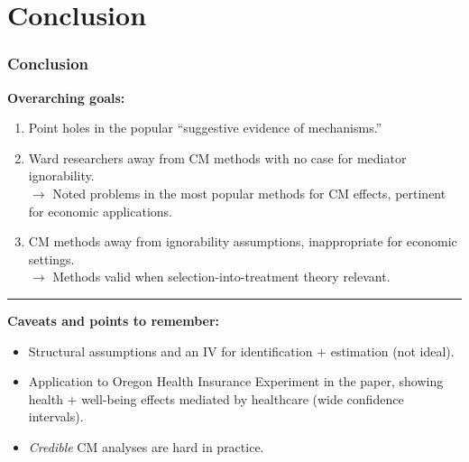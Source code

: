 \documentclass[dvipsnames]{beamer} %
\begin{document}
\section{Conclusion}
\begin{frame}
    \frametitle{Conclusion}
    \textbf{Overarching goals:}
    \begin{enumerate}
        \item Point holes in the popular ``suggestive evidence of mechanisms.''
        \item Ward researchers away from CM methods with no case for mediator ignorability. \\
        $\to$ Noted problems in the most popular methods for CM effects, pertinent for economic applications.
        \item CM methods away from ignorability assumptions, inappropriate for economic settings. \\
        $\to$ Methods valid when selection-into-treatment theory relevant.
    \end{enumerate}
    \par\noindent\rule{\textwidth}{0.4pt}
    \small
    \textbf{Caveats and points to remember:}
    \begin{itemize}
        \item Structural assumptions and an IV for identification $+$ estimation (not ideal).
        \item Application to Oregon Health Insurance Experiment in the paper, showing health $+$ well-being effects mediated by healthcare (wide confidence intervals).
        \item \textit{Credible} CM analyses are hard in practice.
    \end{itemize}
\end{frame}
\end{document}
